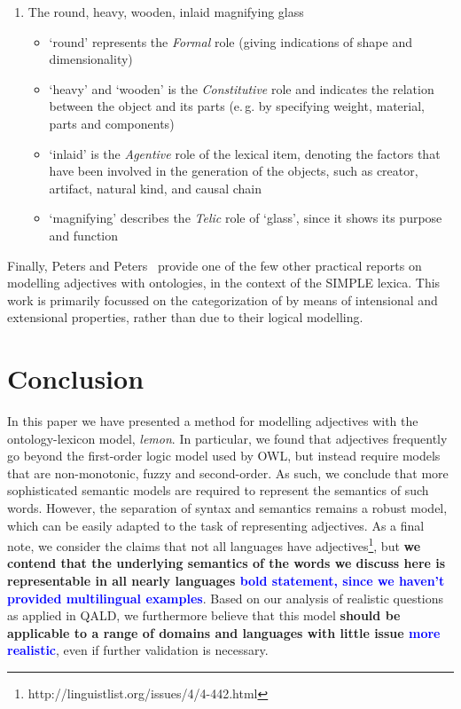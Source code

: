 \documentclass[11pt]{article}
\begin{document}
\begin{enumerate}
\item The round, heavy, wooden, inlaid magnifying glass \label{ex:qualia}
\begin{itemize}[noitemsep]
\item `round' represents the \textit{Formal} role (giving indications of shape and dimensionality)
\item `heavy' and `wooden' is the \textit{Constitutive} role and indicates the relation between the object and its parts (e.\,g. by specifying weight, material, parts and components)
\item `inlaid' is the \textit{Agentive} role of the lexical item, denoting the factors that have been involved in the generation of the objects, such as creator, artifact, natural kind, and causal chain
\item `magnifying' describes the \textit{Telic} role of `glass', since it shows its purpose and function
\end{itemize}
\end{enumerate}

Finally, Peters and Peters~ provide one of the few other practical reports on modelling adjectives with ontologies, in the context of the SIMPLE lexica. This work is primarily focussed on the categorization of by means of intensional and extensional properties, rather than due to their logical modelling. 

\section{Conclusion}

In this paper we have presented a method for modelling adjectives with the
ontology-lexicon model, \emph{lemon}. In particular, we found that adjectives
frequently go beyond the first-order logic model used by OWL, but instead 
require models that are non-monotonic, fuzzy and second-order. As such, we 
conclude that more sophisticated semantic models are required to represent the semantics
of such words. However, the separation of syntax and semantics remains a robust
model, which can be easily adapted to the task of representing adjectives. As 
a final note, we consider the claims that not all languages have adjectives\footnote{http://linguistlist.org/issues/4/4-442.html}, but \textbf{we contend that the underlying semantics of the words we discuss here
is representable in all nearly languages \textcolor{blue}{bold statement, since we haven't provided multilingual examples}}. Based on our analysis of realistic
questions as applied in QALD, we furthermore believe that this model \textbf{should be applicable
to a range of domains and languages with little issue \textcolor{blue}{more realistic}}, even if further 
validation is necessary.

\begin{spacing}{.4}


\end{spacing}
\end{document}
